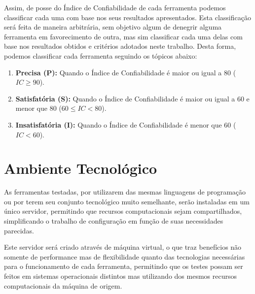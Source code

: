 Assim, de posse do Índice de Confiabilidade de cada ferramenta podemos classificar cada uma com base nos seus resultados apresentados. Esta classificação será feita de maneira arbitrária, sem objetivo algum de denegrir alguma ferramenta em favorecimento de outra, mas sim classificar cada uma delas com base nos resultados obtidos e critérios adotados neste trabalho. Desta forma, podemos classificar cada ferramenta seguindo os tópicos abaixo:

\begin{enumerate}
    \item \textbf{Precisa (P):} Quando o Índice de Confiabilidade é maior ou igual a 80 ($IC\geq90$).
    \item \textbf{Satisfatória (S):} Quando o Índice de Confiabilidade é maior ou igual a 60 e menor que 80 ($60 \leq IC < 80$).
    \item \textbf{Insatisfatória (I):} Quando o Índice de Confiabilidade é menor que 60 ($IC < 60$).
\end{enumerate}

\section{Ambiente Tecnológico}
\label{sec:tech-environment}

As ferramentas testadas, por utilizarem das mesmas linguagens de programação ou por terem seu conjunto tecnológico muito semelhante, serão instaladas em um único servidor, permitindo que recursos computacionais sejam compartilhados, simplificando o trabalho de configuração em função de suas necessidades parecidas.

Este servidor será criado através de máquina virtual, o que traz benefícios não somente de performance mas de flexibilidade quanto das tecnologias necessárias para o funcionamento de cada ferramenta, permitindo que os testes possam ser feitos em sistemas operacionais distintos mas utilizando dos mesmos recursos computacionais da máquina de origem.


